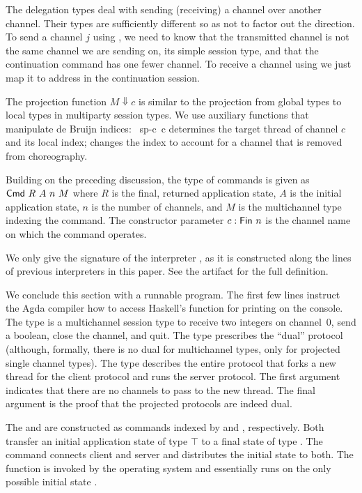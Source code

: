 \documentclass[acmsmall,screen]{acmart}
\begin{document}
The delegation types deal with sending (receiving) a channel over
another channel. Their types are sufficiently different so as not to
factor out the direction. To send a channel $j$ using {\ACdelegateOUT}, we need to know that
the transmitted channel is not the same channel we are sending on, its simple session type,
and that the continuation command has one fewer channel.
To receive a channel using {\ACdelegateIN} we just map it to address
{\Azero} in the continuation session.

The projection function $M \Downarrow c$ is similar to the projection from global
types to local types in multiparty session types. We use
auxiliary functions that manipulate de Bruijn indices:
{\AlocateSplit~sp-c~c} determines the target thread of channel $c$ and
its local index; {\Aadjust} changes the index to account for a channel
that is removed from choreography. 
\multiProjection

Building on the preceding discussion, the type of commands is given as $\ACommand~R~A~n~M$ where
$R$ is the final, returned application state, $A$ is the initial
application state, $n$ is the number of channels, and $M$ is the
multichannel type indexing the command. The constructor parameter $c : \AFin~n$ is
the channel name on which the command operates.

\multiCmd

We only give the signature of the interpreter
{\Aexec}, as it is constructed along the lines of previous
interpreters in this paper. See the artifact for the full definition.

\multiExecSignature


We conclude this section with a runnable program.
\EXMbody
The first few lines instruct the Agda compiler how to access Haskell's
function {\AputStrLn} for printing on the console.
The type {\Aserverp} is a multichannel session type to receive two integers on channel~0, send a boolean,
close the channel, and quit. The type {\Aclientp} prescribes the ``dual''
protocol (although, formally, there is no dual for multichannel types,
only for projected single channel types). The type {\Aprotocol}
describes the entire protocol that forks a new thread for the client
protocol and runs the server protocol. The first argument {\Anull}
indicates that there are no channels to pass to the new thread. The final argument {\Arefl} is
the proof that the projected protocols are indeed dual.

The {\Aserver} and {\Aclient} are constructed as commands indexed by
{\Aserverp} and {\Aclientp}, respectively. Both transfer an initial
application state of type $\top$ to a final state of type
{\ABool}. The {\Asystem} command connects client  and server and
distributes the initial state to both. The {\Amain} function is
invoked by the operating system and essentially runs {\Asystem} on the
only possible initial state {\Att}.
\end{document}
